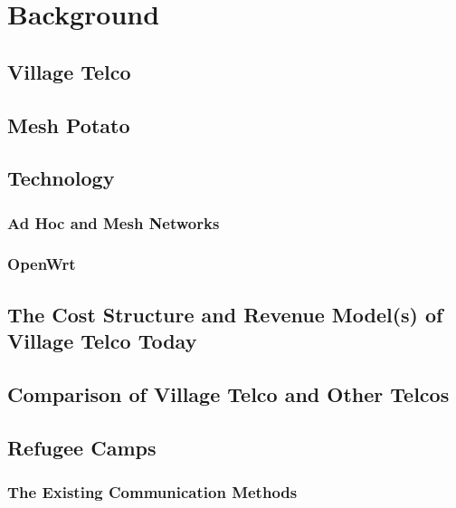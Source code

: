 \chapter{Background}
\label{chp:background} 

\section{Village Telco}

\section{Mesh Potato}

\section{Technology}

\subsection{Ad Hoc and Mesh Networks}
\subsection{OpenWrt}


\section{The Cost Structure and Revenue Model(s) of Village Telco Today}

\section{Comparison of Village Telco and Other Telcos}

\section{Refugee Camps}
\subsection{The Existing Communication Methods}